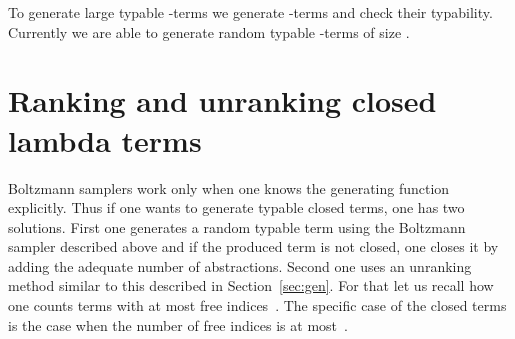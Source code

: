 \documentclass{sig-alternate}
\begin{document}
\begin{figure*}[!t]
To generate large typable -terms we generate -terms and check their
typability. Currently we are able to generate random typable -terms of size
.

\section{Ranking and unranking closed lambda terms}
\label{sec:closedTerm}

Boltzmann samplers work only when one knows the generating function explicitly.  Thus
if one wants to generate typable closed terms, one has two solutions.  First one
generates a random typable term using the Boltzmann sampler described above and if
the produced term is not closed, one closes it by adding the adequate number of
abstractions.  Second one uses an unranking method similar to this described in
Section~\ref{sec:gen}.  For that let us recall how one counts terms with at most 
free indices~\cite{DBLP:journals/corr/GrygielL14}. The specific case of the closed terms is
the case when the number of free indices is at most~.


\end{figure*}
\end{document}
